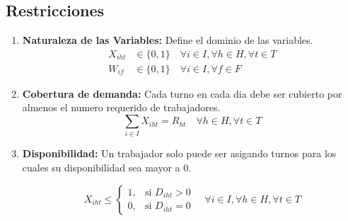 \documentclass{article}
\begin{document}
\subsection*{Restricciones}
\begin{enumerate}
    \item \textbf{Naturaleza de las Variables:} Define el dominio de las variables.
    \begin{align}
        X_{iht} &\in \{0, 1\} \quad \forall i \in I, \forall h \in H, \forall t \in T \\
        W_{if} &\in \{0, 1\} \quad \forall i \in I, \forall f \in F
    \end{align}

    \item \textbf{Cobertura de demanda: }
    Cada turno en cada dia debe ser cubierto por almenos el numero requerido de trabajadores.
    \begin{equation}
        \sum_{i \in I} X_{iht}  =  R_{ht}
        \quad \forall h \in H, \forall t \in T
    \end{equation}

    \item \textbf{Disponibilidad: }
    Un trabajador solo puede ser asigando turnos para los cuales su disponibilidad sea mayor a 0.

    \begin{equation}
        X_{iht} \le
        \begin{cases}
        1, & \text{si } D_{iht} > 0\\
        0, & \text{si } D_{iht} = 0
        \end{cases}
        \quad \forall i \in I, \forall h \in H, \forall t \in T
    \end{equation}


\end{enumerate}
\end{document}
